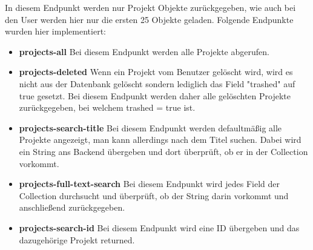 In diesem Endpunkt werden nur Projekt Objekte zurückgegeben, wie auch bei den User werden hier nur die ersten 25 Objekte geladen. Folgende Endpunkte wurden hier implementiert:
\begin{itemize}
    \item \textbf{projects-all}
        \newline
        Bei diesem Endpunkt werden alle Projekte abgerufen.
    \item \textbf{projects-deleted}
        \newline
        Wenn ein Projekt vom Benutzer gelöscht wird, wird es nicht aus der Datenbank gelöscht sondern lediglich das Field "trashed" auf true gesetzt. Bei diesem Endpunkt werden daher alle gelöschten Projekte zurückgegeben, bei welchem trashed = true ist.
    \item \textbf{projects-search-title}
        \newline
        Bei diesem Endpunkt werden defaultmäßig alle Projekte angezeigt, man kann allerdings nach dem Titel suchen. Dabei wird ein String ans Backend übergeben und dort überprüft, ob er in der Collection vorkommt.
    \item \textbf{projects-full-text-search}
        \newline
        Bei diesem Endpunkt wird jedes Field der Collection durchsucht und überprüft, ob der String darin vorkommt und anschließend zurückgegeben.
    \item \textbf{projects-search-id}
        \newline
        Bei diesem Endpunkt wird eine ID übergeben und das dazugehörige Projekt returned.
\end{itemize}